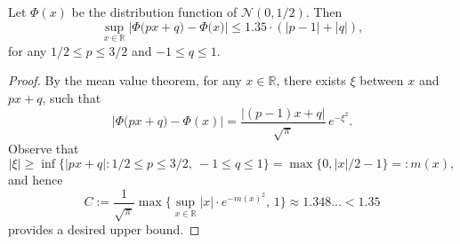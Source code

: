 \documentclass[10pt,a4paper]{amsart}
\newcommand{\R}{\mathbb R}
\begin{document}
\begin{lemma}\label{lem-normal-ball-probability}
	Let $\Phi(x)$ be the distribution function of $\mathcal N(0,1/2)$. Then
	$$
	\sup_{x\in \R}\bigg| \Phi\big(px+q\big) - \Phi\big(x\big)\bigg|
	\leq 1.35 \cdot (|p-1|+|q|),
	$$
	for any $1/2\leq p\leq 3/2$ and $-1\leq q \leq 1$.
\end{lemma}

\begin{proof} 
	By the mean value theorem, for any $x\in \R$, there exists $\xi$ between $x$ and $px+q$, such that
	$$
	\Big|\Phi\big(px+q\big)- \Phi(x)\Big|
	= \frac{|(p-1)x+q|}{\sqrt{\pi}} \,e^{-\xi^2}.
	$$
	Observe that
	$$
	|\xi|\geq \inf \big\{|px+q|: 1/2 \leq p \leq 3/2,\ -1\leq q \leq 1\big\}
	=\max\big\{0,|x|/2 -1 \big\}=: m(x),
	$$
	and hence
	$$
	C:= \frac{1}{\sqrt{\pi}}\max \bigg\{ \sup_{x\in \R} |x|\cdot e^{-m(x)^2}, \, 1\bigg\}\approx 1.348... <1.35 
	$$
	provides a desired upper bound.
\end{proof}
\end{document}
